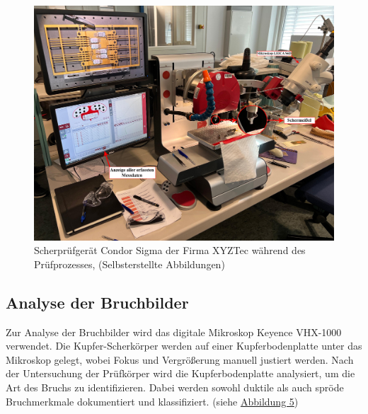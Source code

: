 \begin{figure}[H]
    \centering
    \includegraphics[scale=0.2]{Bilder/WhatsApp Image 2025-03-28 at 17.45.42.jpeg}
    \caption{Scherprüfgerät Condor Sigma der Firma XYZTec während des Prüfprozesses, (Selbsterstellte Abbildungen)}
    \label{CondorSigma}
\end{figure}

\subsection{Analyse der Bruchbilder}
Zur Analyse der Bruchbilder wird das digitale Mikroskop Keyence VHX-1000 verwendet. Die Kupfer-Scherkörper werden auf einer Kupferbodenplatte unter das Mikroskop gelegt, wobei Fokus und Vergrößerung manuell justiert werden. Nach der Untersuchung der Prüfkörper wird die Kupferbodenplatte analysiert, um die Art des Bruchs zu identifizieren. Dabei werden sowohl duktile als auch spröde Bruchmerkmale dokumentiert und klassifiziert. (siehe \hyperref[VHX]{Abbildung 5})

